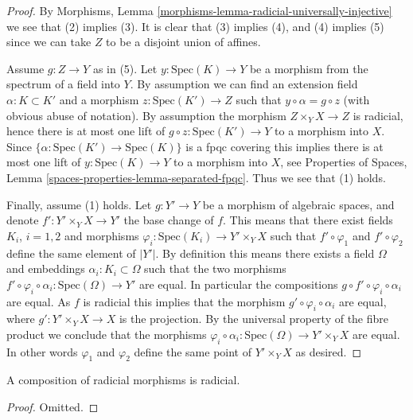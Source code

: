 \begin{proof}
By
Morphisms, Lemma \ref{morphisms-lemma-radicial-universally-injective}
we see that (2) implies (3). It is clear that (3) implies (4),
and (4) implies (5) since we can take $Z$ to be a disjoint union
of affines.

\medskip\noindent
Assume $g : Z \to Y$ as in (5). Let $y : \text{Spec}(K) \to Y$ be a
morphism from the spectrum of a field into $Y$. By assumption we
can find an extension field $\alpha : K \subset K'$ and a morphism
$z : \text{Spec}(K') \to Z$ such that $y \circ \alpha = g \circ z$
(with obvious abuse of notation). By assumption the
morphism $Z \times_Y X \to Z$ is radicial, hence there is at most one
lift of $g \circ z : \text{Spec}(K') \to Y$ to a morphism into $X$.
Since $\{\alpha : \text{Spec}(K') \to \text{Spec}(K)\}$ is a
fpqc covering this implies there is at most one lift of
$y : \text{Spec}(K) \to Y$ to a morphism into $X$, see
Properties of Spaces, Lemma \ref{spaces-properties-lemma-separated-fpqc}.
Thus we see that (1) holds.

\medskip\noindent
Finally, assume (1) holds. Let $g : Y' \to Y$ be a morphism of algebraic
spaces, and denote $f' : Y' \times_Y X \to Y'$ the base change of $f$.
This means that there exist fields $K_i$, $i = 1, 2$ and morphisms
$\varphi_i : \text{Spec}(K_i) \to Y' \times_Y X$
such that $f' \circ \varphi_1$ and $f' \circ \varphi_2$ define the
same element of $|Y'|$. By definition this means there exists a
field $\Omega$ and embeddings $\alpha_i : K_i \subset \Omega$ such that
the two morphisms
$f' \circ \varphi_i \circ \alpha_i : \text{Spec}(\Omega) \to Y'$ are equal.
In particular the compositions $g \circ f' \circ \varphi_i \circ \alpha_i$
are equal. As $f$ is radicial this implies that the morphism
$g' \circ \varphi_i \circ \alpha_i$ are equal, where $g' : Y' \times_Y X \to X$
is the projection. By the universal property of the fibre product we conclude
that the morphisms
$\varphi_i \circ \alpha_i : \text{Spec}(\Omega) \to Y' \times_Y X$ are
equal. In other words $\varphi_1$ and $\varphi_2$ define the same point
of $Y' \times_Y X$ as desired.
\end{proof}

\begin{lemma}
\label{lemma-composition-radicial}
A composition of radicial morphisms is radicial.
\end{lemma}

\begin{proof}
Omitted.
\end{proof}






